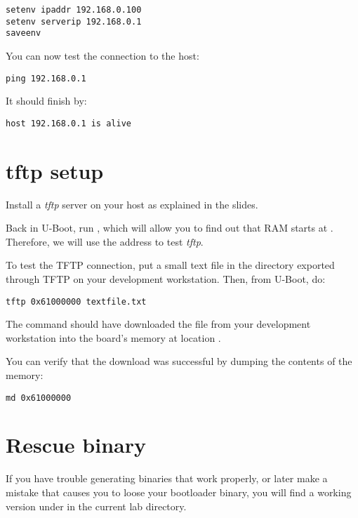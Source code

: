 \begin{verbatim}
setenv ipaddr 192.168.0.100
setenv serverip 192.168.0.1
saveenv
\end{verbatim}

You can now test the connection to the host:
\begin{verbatim}
ping 192.168.0.1
\end{verbatim}

It should finish by:
\begin{verbatim}
host 192.168.0.1 is alive
\end{verbatim}

\section{tftp setup}

Install a {\em tftp} server on your host as explained in the slides.

Back in U-Boot, run , which will allow you to find out that
RAM starts at . Therefore, we will use the 
address to test {\em tftp}.

To test the TFTP connection, put a small text file in
the directory exported through TFTP on your development
workstation. Then, from U-Boot, do:

\begin{verbatim}
tftp 0x61000000 textfile.txt
\end{verbatim}

The  command should have downloaded the
 file from your development workstation into
the board's memory at location .

You can verify that the download was successful by dumping the
contents of the memory:

\begin{verbatim}
md 0x61000000
\end{verbatim}

\section{Rescue binary}

If you have trouble generating binaries that work properly, or later
make a mistake that causes you to loose your bootloader binary, you
will find a working version under  in the current lab
directory.
